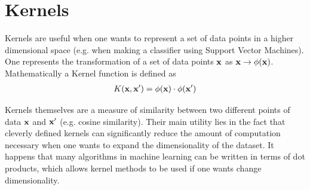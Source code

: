 \section{Kernels}\label{kernels}
Kernels are useful when one wants to represent a set of data points in a higher dimensional space (e.g. when making a classifier using Support Vector Machines). One represents the transformation of a set of data points $\textbf{x}$ as $\textbf{x}\rightarrow \phi(\textbf{x})$. Mathematically a Kernel function is defined as
\begin{align}
	K(\textbf{x},\textbf{x}') = \phi(\textbf{x})\cdot \phi(\textbf{x}')
\end{align}

 Kernels themselves are a measure of similarity between two different points of data $\textbf{x}$ and $\textbf{x}'$ (e.g. cosine similarity). Their main utility lies in the fact that cleverly defined kernels can significantly reduce the amount of computation necessary when one wants to expand the dimensionality of the dataset. It happens that many algorithms in machine learning can be written in terms of dot products, which allows kernel methods to be used if one wants change dimensionality.

